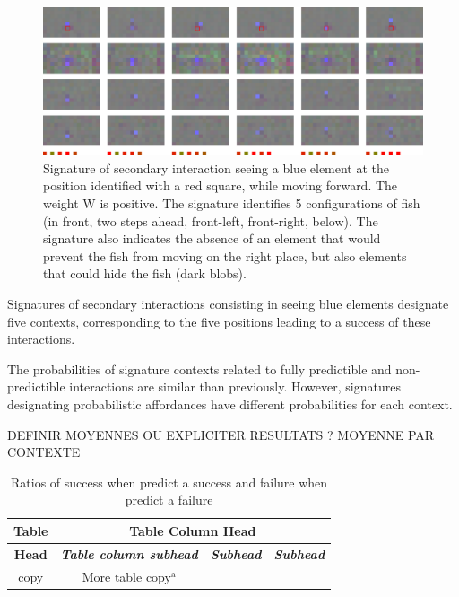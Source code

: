 \documentclass[conference]{IEEEtran}
\begin{document}
\begin{figure}[htbp]
\centerline{\includegraphics[scale=0.35]{img/sig_blue.pdf}}
\caption{Signature of secondary interaction seeing a blue element at the position identified with a red square, while moving forward. The weight W is positive. The signature identifies 5 configurations of fish (in front, two steps ahead, front-left, front-right, below). The signature also indicates the absence of an element that would prevent the fish from moving on the right place, but also elements that could hide the fish (dark blobs).}
\label{fig}
\end{figure}

Signatures of secondary interactions consisting in seeing blue elements designate five contexts, corresponding to the five positions leading to a success of these interactions.

The probabilities of signature contexts related to fully predictible and non-predictible interactions are similar than previously. However, signatures designating probabilistic affordances have different probabilities for each context.

DEFINIR MOYENNES OU EXPLICITER RESULTATS ? MOYENNE PAR CONTEXTE

\begin{table}[htbp]
\caption{Ratios of success when predict a success and failure when predict a failure}
\begin{center}
\begin{tabular}{|c|c|c|c|}
\hline
\textbf{Table}&\multicolumn{3}{|c|}{\textbf{Table Column Head}} \\
\hline 
\textbf{Head} & \textbf{\textit{Table column subhead}}& \textbf{\textit{Subhead}}& \textbf{\textit{Subhead}} \\
\hline
copy& More table copy$^{\mathrm{a}}$& &  \\
\hline
\end{tabular}
\label{tab1}
\end{center}
\end{table}
\end{document}
